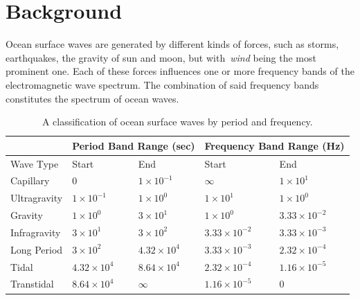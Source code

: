 

\renewcommand{\Re}{\mathcal{R}}
\renewcommand{\Im}{\mathcal{I}} 
%
\chapter{Background}
\label{ch:background}
%
Ocean surface waves are generated by different kinds of forces, such as 
storms, earthquakes, the gravity of sun and moon, but with~\emph{wind} being
the most prominent one. Each of these forces influences one or more frequency
bands of the electromagnetic wave spectrum. The combination of said frequency
bands constitutes the spectrum of ocean waves.
%
\begin{table}[h]
\begin{tabularx}{\textwidth}{X | X X | X X }
  \cline{2-5}
  & \multicolumn{2}{c}{Period Band Range (sec)} \vline & \multicolumn{2}{c}{Frequency Band Range (Hz)} \\
  \hline
  Wave Type & Start & End & Start & End \\
 \hline
  Capillary    & $0$                & $1\times10^{-1}$   & $\infty$            & $1\times10^1$ \\
  Ultragravity & $1\times10^{-1}$   & $1\times10^{0}$    & $1\times10^1$       & $1\times10^0$ \\
  Gravity      & $1\times10^{0}$    & $3\times10^{1}$    & $1\times10^0$       & $3.33\times10^{-2}$ \\
  Infragravity & $3\times10^{1}$    & $3\times10^{2}$    & $3.33\times10^{-2}$ & $3.33\times10^{-3}$ \\
  Long Period  & $3\times10^{2}$    & $4.32\times10^{4}$ & $3.33\times10^{-3}$ & $2.32\times10^{-4}$ \\
  Tidal        & $4.32\times10^{4}$ & $8.64\times10^{4}$ & $2.32\times10^{-4}$ & $1.16\times10^{-5}$ \\
  Transtidal   & $8.64\times10^{4}$ & $\infty$           & $1.16\times10^{-5}$ & $0$
\end{tabularx}
\caption{A classification of ocean surface waves by period and frequency.}
\label{tab:ocean_wave_period}
\end{table}
%

